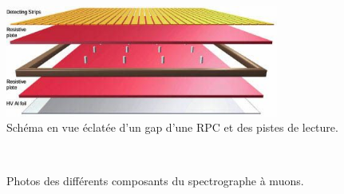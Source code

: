 \begin{itemize}[label=$\bullet$]
	  \begin{figure}[ht!]
		\centering
		\includegraphics[width=0.80\textwidth]{CMS/RPC2.jpg}
		\captionsetup{type=figure}\caption{Schéma en vue éclatée d'un gap d'une RPC et des pistes de lecture.}
		\label{RPC2}
	\end{figure}
	
	
\end{itemize}
    \begin{figure}[ht!]
	\centering
	\\
	\caption{Photos des différents composants du spectrographe à muons.}
\end{figure}

